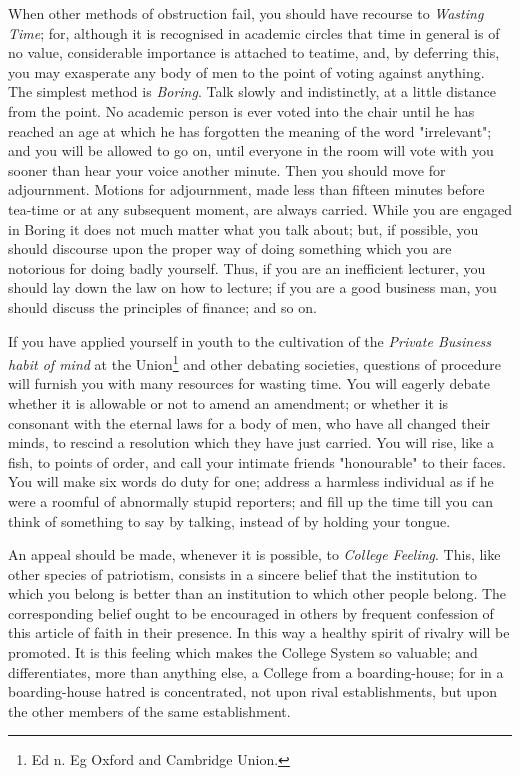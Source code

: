 \documentclass[12pt, oneside, b5paper]{memoir}
\begin{document}
When other methods of obstruction fail, you should have recourse to \emph{Wasting Time}; for, although it is recognised in academic circles that time in general is of no value, considerable importance is attached to teatime, and, by deferring this, you may exasperate any body of men to the point of voting against anything. The simplest method is \emph{Boring}. Talk slowly and indistinctly, at a little distance from the point. No academic person is ever voted into the chair until he has reached an age at which he has forgotten the meaning of the word "irrelevant"; and you will be allowed to go on, until everyone in the room will vote with you sooner than hear your voice another minute. Then you should move for adjournment. Motions for adjournment, made less than fifteen minutes before tea-time or at any subsequent moment, are always carried. While you are engaged in Boring it does not much matter what you talk about; but, if possible, you should discourse upon the proper way of doing something which you are notorious for doing badly yourself. Thus, if you are an inefficient lecturer, you should lay down the law on how to lecture;\label{lecture} if you are a good business man, you should discuss the principles of finance; and so on.

If you have applied yourself in youth to the cultivation of the \emph{Private Business habit of mind} at the Union\footnote{Ed n. Eg Oxford and Cambridge Union.} and other debating societies, questions of procedure will furnish you with many resources for wasting time. You will eagerly debate whether it is allowable or not to amend an amendment; or whether it is consonant with the eternal laws for a body of men, who have all changed their minds, to rescind a resolution which they have just carried. You will rise, like a fish, to points of order, and call your intimate friends "honourable" to their faces. You will make six words do duty for one; address a harmless individual as if he were a roomful of abnormally stupid reporters; and fill up the time till you can think of something to say by talking, instead of by holding your tongue. 

An appeal should be made, whenever it is possible, to \emph{College Feeling}. This, like other species of patriotism, consists in a sincere belief that the institution to which you belong is better than an institution to which other people belong. The corresponding belief ought to be encouraged in others by frequent confession of this article of faith in their presence. In this way a healthy spirit of rivalry will be promoted. It is this feeling which makes the College System so valuable; and differentiates, more than anything else, a College from a boarding-house; for in a boarding-house hatred is concentrated, not upon rival establishments, but upon the other members of the same establishment.
\end{document}
